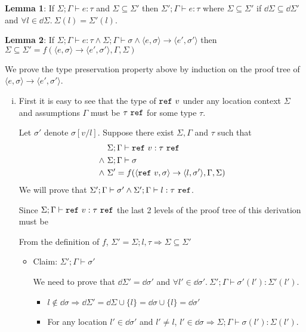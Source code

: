 \begin{enumerate}[(a)]
\textbf{Lemma 1}: If $\Sigma;\Gamma \vdash e : \tau$ and $\Sigma \subseteq \Sigma'$ then $\Sigma';\Gamma \vdash e : \tau$ where $\Sigma \subseteq \Sigma'$ if $\dd \Sigma \subseteq \dd \Sigma'$ and $\forall l \in \dd \Sigma. ~ \Sigma(l) = \Sigma'(l)$.


\textbf{Lemma 2}: If $\Sigma;\Gamma \vdash e : \tau \wedge\Sigma;\Gamma \vdash \sigma \wedge \langle e, \sigma \rangle \rightarrow \langle e', \sigma' \rangle$ then $\Sigma \subseteq \Sigma' =  f(\langle e, \sigma \rangle \rightarrow \langle e', \sigma' \rangle, \Gamma, \Sigma)$

We prove the type preservation property above by induction on the proof tree of $\langle e, \sigma \rangle \rightarrow \langle e', \sigma' \rangle$.

\begin{enumerate}[i.]
\item 

  First it is easy to see that the type of $\texttt{ref}~v$ under any location context $\Sigma$ and assumptions $\Gamma$ must be $\tau~\texttt{ref}$ for some type $\tau$.

  Let $\sigma'$ denote $\sigma[v/l]$. Suppose there exist $\Sigma, \Gamma$ and $\tau$ such that 
  \begin{align*}
  &\Sigma;\Gamma \vdash \texttt{ref}~v : \tau~\texttt{ref} \\
  \wedge~&\Sigma;\Gamma \vdash \sigma\\
  \wedge~&\Sigma' = f(\langle \texttt{ref}~v, \sigma \rangle \rightarrow \langle l, \sigma' \rangle, \Gamma, \Sigma)
  \end{align*}
  We will prove that $\Sigma';\Gamma \vdash \sigma' \wedge \Sigma';\Gamma \vdash l : \tau ~\texttt{ref}$.

  Since $\Sigma;\Gamma \vdash \texttt{ref}~v : \tau~\texttt{ref}$ the last 2 levels of the proof tree of this derivation must be


  From the definition of $f$, $\Sigma' = \Sigma; l, \tau \Rightarrow \Sigma \subseteq \Sigma'$

  \begin{itemize}
    \item Claim: $\Sigma';\Gamma \vdash \sigma'$

    We need to prove that $\dd \Sigma' = \dd \sigma'$ and $\forall l' \in \dd \sigma'.~\Sigma';\Gamma \vdash \sigma'(l') : \Sigma'(l')$.
    \begin{itemize}
    \item $l \notin \dd \sigma \Rightarrow \dd \Sigma' = \dd \Sigma \cup \{l\} = \dd \sigma \cup \{l\} = \dd \sigma'$
    \item For any location $l' \in \dd \sigma'$ and $l' \neq l$, $l' \in \dd \sigma \Rightarrow \Sigma; \Gamma \vdash \sigma(l') : \Sigma(l')$. 


\end{itemize}
\end{itemize}
\end{enumerate}
\end{enumerate}
